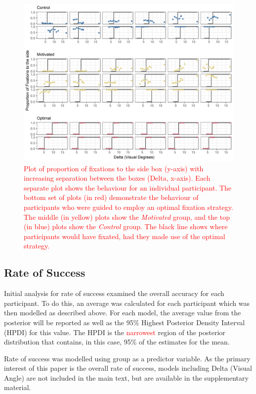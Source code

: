 \documentclass[vision,article,submit,moreauthors,pdftex,10pt,a4paper]{mdpi}
\begin{document}
\begin{figure}[H]
	\centering
	\includegraphics[width=16 cm]{../Figures/Part_2_all_groups.png}
	\caption{\textcolor{red}{Plot of proportion of fixations to the side box (y-axis) with increasing separation between the boxes (Delta, x-axis). Each separate plot shows the behaviour for an individual participant. The bottom set of plots (in red) demonstrate the behaviour of participants who were guided to employ an optimal fixation strategy. The middle (in yellow) plots show the \textit{Motivated} group, and the top (in blue) plots show the \textit{Control} group. The black line shows where participants would have fixated, had they made use of the optimal strategy.}
	}
	\label{fig:proportion}
\end{figure} 

\subsection{Rate of Success}
Initial analysis for rate of success examined the overall accuracy for each participant. To do this, an average was calculated for each participant which was then modelled as described above. For each model, the average value from the posterior will be reported as well as the 95\% Highest Posterior Density Interval (HPDI) for this value. The HPDI is the \textcolor{red}{narrowest} region of the posterior distribution that contains, in this case, 95\% of the estimates for the mean. 

Rate of success was modelled using group as a predictor variable. As the primary interest of this paper is the overall rate of success, models including Delta (Visual Angle) are not included in the main text, but are available in the supplementary material.
\end{document}
